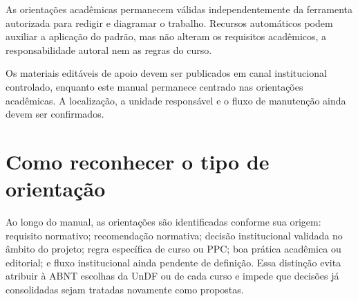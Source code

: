 As orientações acadêmicas permanecem válidas independentemente da ferramenta autorizada para redigir e diagramar o trabalho. Recursos automáticos podem auxiliar a aplicação do padrão, mas não alteram os requisitos acadêmicos, a responsabilidade autoral nem as regras do curso.

\fluxopendente

Os materiais editáveis de apoio devem ser publicados em canal institucional controlado, enquanto este manual permanece centrado nas orientações acadêmicas. A localização, a unidade responsável e o fluxo de manutenção ainda devem ser confirmados.

\section{Como reconhecer o tipo de orientação}

Ao longo do manual, as orientações são identificadas conforme sua origem: requisito normativo; recomendação normativa; decisão institucional validada no âmbito do projeto; regra específica de curso ou PPC; boa prática acadêmica ou editorial; e fluxo institucional ainda pendente de definição. Essa distinção evita atribuir à ABNT escolhas da UnDF ou de cada curso e impede que decisões já consolidadas sejam tratadas novamente como propostas.
